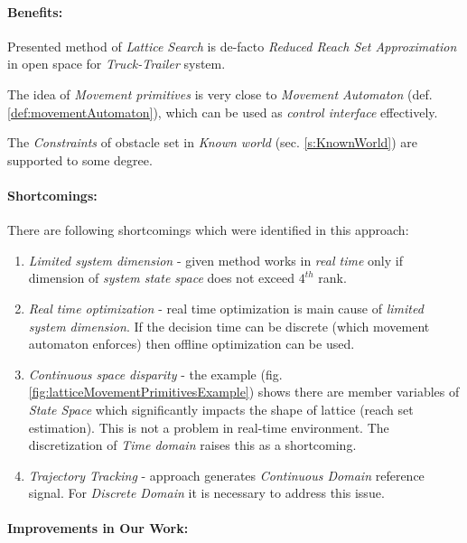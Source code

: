 \paragraph{Benefits:} Presented method of \emph{Lattice Search}  is  de-facto \emph{Reduced Reach Set Approximation} in open space for \emph{Truck-Trailer} system. 

The idea of \emph{Movement primitives} is very close to \emph{Movement Automaton} (def. \ref{def:movementAutomaton}), which can be used as \emph{control interface} effectively. 

The \emph{Constraints} of obstacle set in \emph{Known world} (sec. \ref{s:KnownWorld}) are supported to some degree.

\paragraph{Shortcomings:} There are following shortcomings which were identified in this approach:
\begin{enumerate}
    \item \emph{Limited system dimension} - given method works in \emph{real time} only if dimension of \emph{system state space} does not exceed $4^{th}$  rank.
    
    \item \emph{Real time optimization} - real time optimization is main cause of \emph{limited system dimension}. If the decision time can be discrete (which movement automaton enforces) then offline optimization  can be used. 
    
    \item \emph{Continuous space disparity} - the example (fig. \ref{fig:latticeMovementPrimitivesExample}) shows there are member variables of \emph{State Space} which significantly impacts the shape of lattice (reach set estimation). This is not a problem in real-time environment. The discretization of \emph{Time domain} raises this as a shortcoming.
    
    \item \emph{Trajectory Tracking} - approach generates \emph{Continuous Domain} reference signal. For \emph{Discrete Domain} it is necessary to address this issue.
\end{enumerate}

\paragraph{Improvements in Our Work:}

